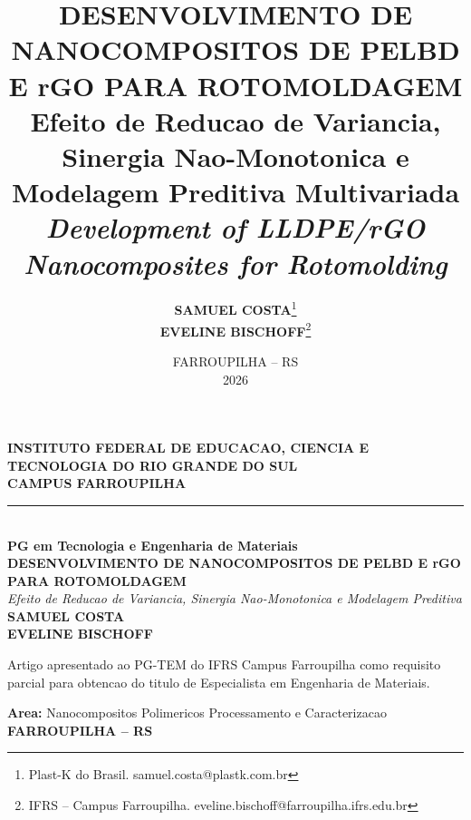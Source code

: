 \documentclass[11pt,a4paper,oneside]{article}
\title{%
    \vspace{0.8cm}
    {\Large\bfseries DESENVOLVIMENTO DE NANOCOMPOSITOS DE PELBD E rGO PARA ROTOMOLDAGEM}\\[3pt]
    {\large\bfseries Efeito de Reducao de Variancia, Sinergia Nao-Monotonica e Modelagem Preditiva Multivariada}\\[6pt]
    \normalsize\textit{Development of LLDPE/rGO Nanocomposites for Rotomolding}
}
\author{%
    {\bfseries SAMUEL COSTA}\thanks{Plast-K do Brasil. samuel.costa@plastk.com.br}\\[3pt]
    {\bfseries EVELINE BISCHOFF}\thanks{IFRS -- Campus Farroupilha. eveline.bischoff@farroupilha.ifrs.edu.br}
}
\date{FARROUPILHA -- RS\\2026}
\begin{document}
\begin{titlepage}
\begin{center}
\vspace*{0.5cm}
{\Large\bfseries INSTITUTO FEDERAL DE EDUCACAO, CIENCIA E TECNOLOGIA DO RIO GRANDE DO SUL}\\[2pt]
{\Large\bfseries CAMPUS FARROUPILHA}\\[4pt]
\rule{\textwidth}{1.5pt}\\[6pt]
{\large\bfseries PG em Tecnologia e Engenharia de Materiais}\\[18pt]
{\LARGE\bfseries DESENVOLVIMENTO DE NANOCOMPOSITOS DE PELBD E rGO PARA ROTOMOLDAGEM}\\[4pt]
{\large\textit{Efeito de Reducao de Variancia, Sinergia Nao-Monotonica e Modelagem Preditiva}}\\[28pt]
{\bfseries SAMUEL COSTA}\\[3pt]{\bfseries EVELINE BISCHOFF}\\[28pt]
\begin{flushright}\begin{minipage}{0.42\textwidth}\footnotesize
Artigo apresentado ao PG-TEM do IFRS Campus Farroupilha como requisito parcial para obtencao do titulo de Especialista em Engenharia de Materiais.
\end{minipage}\end{flushright}
\vspace{14pt}
{\bfseries Area:} Nanocompositos Polimericos Processamento e Caracterizacao\\
\vfill
{\bfseries FARROUPILHA -- RS}
\end{center}
\end{titlepage}
\end{document}
